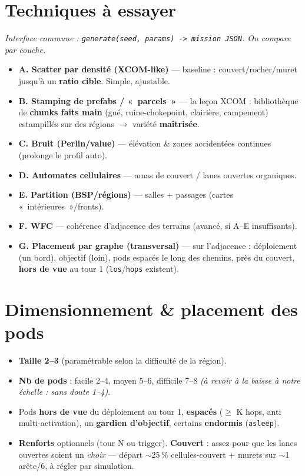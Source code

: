 \documentclass[11pt,a4paper]{article}
\begin{document}
\section{Techniques à essayer}
\emph{Interface commune : \texttt{generate(seed, params) -> mission JSON}. On compare par couche.}
\begin{itemize}
\item \textbf{A. Scatter par densité (XCOM-like)} --- baseline : couvert/rocher/muret jusqu'à un \textbf{ratio cible}. Simple, ajustable.
\item \textbf{B. Stamping de prefabs / «~parcels~»} --- la leçon XCOM : bibliothèque de \textbf{chunks faits main} (gué, ruine-chokepoint, clairière, campement) estampillés sur des régions $\to$ variété \textbf{maîtrisée}.
\item \textbf{C. Bruit (Perlin/value)} --- élévation \& zones accidentées continues (prolonge le profil auto).
\item \textbf{D. Automates cellulaires} --- amas de couvert / lanes ouvertes organiques.
\item \textbf{E. Partition (BSP/régions)} --- salles + passages (cartes «~intérieures~»/fronts).
\item \textbf{F. WFC} --- cohérence d'adjacence des terrains (avancé, si A--E insuffisants).
\item \textbf{G. Placement par graphe (transversal)} --- sur l'adjacence : déploiement (un bord), objectif (loin), pods espacés le long des chemins, près du couvert, \textbf{hors de vue} au tour 1 (\texttt{los}/\texttt{hops} existent).
\end{itemize}

\section{Dimensionnement \& placement des pods}
\begin{itemize}
\item \textbf{Taille 2--3} (paramétrable selon la difficulté de la région).
\item \textbf{Nb de pods} : facile 2--4, moyen 5--6, difficile 7--8 \emph{(à revoir à la baisse à notre échelle : sans doute 1--4)}.
\item Pods \textbf{hors de vue} du déploiement au tour 1, \textbf{espacés} ($\geq$ K hops, anti multi-activation), un \textbf{gardien d'objectif}, certains \textbf{endormis} (\texttt{asleep}).
\item \textbf{Renforts} optionnels (tour N ou trigger). \textbf{Couvert} : assez pour que les lanes ouvertes soient un \emph{choix} --- départ $\sim$25\,\% cellules-couvert + murets sur $\sim$1 arête/6, à régler par simulation.
\end{itemize}
\end{document}
